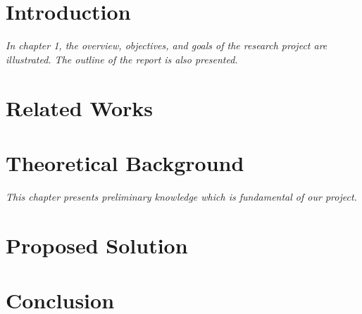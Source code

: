 \documentclass[12pt]{report}
\begin{document}

\setmainfont{Times New Roman}

\clearpage
{} 










% 



\listoftables
\newpage

\listoffigures
\newpage


\chapter{Introduction}

\textit{In chapter 1, the overview, objectives, and goals of the research project are illustrated. The outline of the report is also presented.}









\chapter{Related Works}
\label{chapter:related}


\chapter{Theoretical Background}

\textit{This chapter presents preliminary knowledge which is fundamental of our project.}

\chapter{Proposed Solution}



\chapter{Conclusion}






\end{document}

